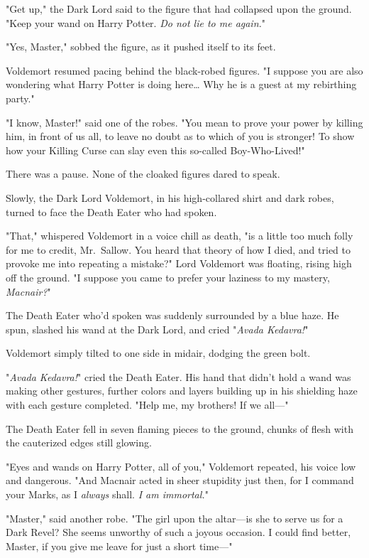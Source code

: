 "Get up," the Dark Lord said to the figure that had collapsed upon the ground.
"Keep your wand on Harry Potter. \emph{Do not lie to me again.}"

"Yes, Master," sobbed the figure, as it pushed itself to its feet.

Voldemort resumed pacing behind the black-robed figures. "I suppose you are
also wondering what Harry Potter is doing here{\ldots} Why he is a guest at my
rebirthing party."

"I know, Master!" said one of the robes. "You mean to prove your power by
killing him, in front of us all, to leave no doubt as to which of you is
stronger! To show how your Killing Curse can slay even this so-called
Boy-Who-Lived!"

There was a pause. None of the cloaked figures dared to speak.

Slowly, the Dark Lord Voldemort, in his high-collared shirt and dark robes,
turned to face the Death Eater who had spoken.

"That," whispered Voldemort in a voice chill as death, "is a little too much
folly for me to credit, Mr.~Sallow. You heard that theory of how I died, and
tried to provoke me into repeating a mistake?" Lord Voldemort was floating,
rising high off the ground. "I suppose you came to prefer your laziness to my
mastery, \emph{Macnair?}"

The Death Eater who'd spoken was suddenly surrounded by a blue haze. He spun,
slashed his wand at the Dark Lord, and cried "\emph{Avada Kedavra!}"

Voldemort simply tilted to one side in midair, dodging the green bolt.

"\emph{Avada Kedavra!}" cried the Death Eater. His hand that didn't hold a wand
was making other gestures, further colors and layers building up in his
shielding haze with each gesture completed. "Help me, my brothers! If we all---"

The Death Eater fell in seven flaming pieces to the ground, chunks of flesh
with the cauterized edges still glowing.

"Eyes and wands on Harry Potter, all of you," Voldemort repeated, his voice low
and dangerous. "And Macnair acted in sheer stupidity just then, for I command
your Marks, as I \emph{always} shall. \emph{I am immortal.}"

"Master," said another robe. "The girl upon the altar---is she to serve us for
a Dark Revel? She seems unworthy of such a joyous occasion. I could find
better, Master, if you give me leave for just a short time---"

